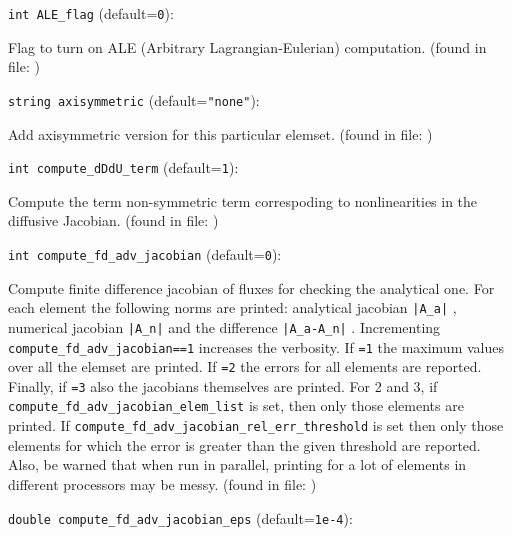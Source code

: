 \item\verb+int ALE_flag+ {\rm(default=\verb|0|)}:

Flag to turn on ALE (Arbitrary Lagrangian-Eulerian) computation. 
 (found in file: \verb++)
\item\verb+string axisymmetric+ {\rm(default=\verb|"none"|)}:

Add axisymmetric version for this particular elemset.
 (found in file: \verb++)
\item\verb+int compute_dDdU_term+ {\rm(default=\verb|1|)}:

Compute the term non-symmetric term
 correspoding to nonlinearities in the
 diffusive Jacobian.
 (found in file: \verb++)
\item\verb+int compute_fd_adv_jacobian+ {\rm(default=\verb|0|)}:

Compute finite difference jacobian of fluxes for checking the
 analytical one. For each element the following norms are printed:
 analytical jacobian \verb+|A_a|+ , numerical jacobian \verb+|A_n|+ and the
 difference \verb+|A_a-A_n|+ . Incrementing \verb+compute_fd_adv_jacobian==1+
 increases the verbosity. If \verb+=1+ the maximum values over all the
 elemset are printed. If \verb+=2+ the errors for all elements are
 reported. Finally, if \verb+=3+ also the jacobians themselves are
 printed. For 2 and 3, if \verb+compute_fd_adv_jacobian_elem_list+ is
 set, then only those elements are printed. If
 \verb+compute_fd_adv_jacobian_rel_err_threshold+ is set then only those
 elements for which the error is greater than the given threshold
 are reported.  Also, be warned that when run in parallel, printing
 for a lot of elements in different processors may be messy.
 (found in file: \verb++)
\item\verb+double compute_fd_adv_jacobian_eps+ {\rm(default=\verb|1e-4|)}:

